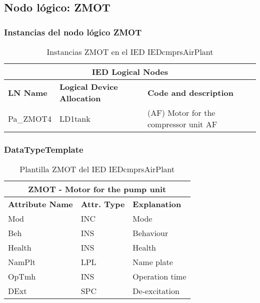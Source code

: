 
\subsection{Nodo l\'ogico: 			 ZMOT}

    \subsubsection{Instancias del nodo l\'ogico ZMOT}
    \begin{table}[H]
    \begin{center}
    \begin{tabular}{|l|l|p{6.8cm}|}
            \hline
            \multicolumn{3}{|c|}{\cellcolor[gray]{0.8} \textbf{IED Logical Nodes} } \\
            \hline
            \textbf{LN Name} & \textbf{Logical Device Allocation} & \textbf{Code and description} \\
            \hline
            Pa\_ZMOT4 & LD1tank & (AF) Motor for the compressor unit AF \\
            \hline
    \end{tabular}
    \caption{Instancias ZMOT en el IED IEDcmprsAirPlant}
    \label{table:lnInstZMOTa}
    \end{center}
    \end{table}
    
    
    
    \subsubsection{DataTypeTemplate}
    \begin{table}[H]
    \begin{center}
    \begin{tabular}{|l|l|p{8.5cm}|}
            \hline
            \multicolumn{3}{|c|}{\cellcolor[gray]{0.8} \textbf{ ZMOT}  - Motor for the pump unit} \\
            \hline
            \textbf{Attribute Name} & \textbf{Attr. Type} & \textbf{Explanation} \\
            \hline 
            Mod & INC & Mode \\
            \hline
            Beh & INS & Behaviour \\
            \hline
            Health & INS & Health \\
            \hline
            NamPlt & LPL & Name plate \\
            \hline
            OpTmh & INS & Operation time \\
            \hline
            DExt & SPC & De-excitation \\
            \hline
    \end{tabular}
    \caption{Plantilla ZMOT del IED IEDcmprsAirPlant}
    \label{table:lnTypeZMOTa}
    \end{center}
    \end{table}
    
    
    